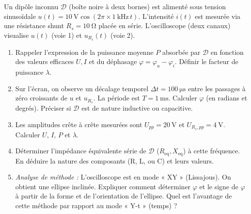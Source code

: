 \documentclass[11pt]{article}
\begin{document}
\begin{exercice}
Un dipôle inconnu $\mathcal{D}$ (boîte noire à deux bornes) est alimenté sous tension sinusoïdale $u(t) = \SI{10}{\volt}\cos(2\pi \times \SI{1}{\kilo\hertz}\, t)$. L'intensité $i(t)$ est mesurée via une résistance shunt $R_s = \SI{10}{\ohm}$ placée en série. L'oscilloscope (deux canaux) visualise $u(t)$ (voie 1) et $u_{R_s}(t)$ (voie 2).
\begin{enumerate}
    \item Rappeler l'expression de la puissance moyenne $P$ absorbée par $\mathcal{D}$ en fonction des valeurs efficaces $U, I$ et du déphasage $\varphi = \varphi_u - \varphi_i$. Définir le facteur de puissance $\lambda$.
    \item Sur l'écran, on observe un décalage temporel $\Delta t = \SI{100}{\micro\second}$ entre les passages à zéro croissants de $u$ et $u_{R_s}$. La période est $T = \SI{1}{\milli\second}$. Calculer $\varphi$ (en radians et degrés). Préciser si $\mathcal{D}$ est de nature inductive ou capacitive.
    \item Les amplitudes crête à crête mesurées sont $U_{pp} = \SI{20}{\volt}$ et $U_{R_s,pp} = \SI{4}{\volt}$. Calculer $U$, $I$, $P$ et $\lambda$.
    \item Déterminer l'impédance équivalente série de $\mathcal{D}$ ($R_{\text{eq}}, X_{\text{eq}}$) à cette fréquence. En déduire la nature des composants (R, L, ou C) et leurs valeurs.
    \item \textit{Analyse de méthode :} L'oscilloscope est en mode « XY » (Lissajous). On obtient une ellipse inclinée. Expliquer comment déterminer $\varphi$ et le signe de $\varphi$ à partir de la forme et de l'orientation de l'ellipse. Quel est l'avantage de cette méthode par rapport au mode « Y-t » (temps) ?
\end{enumerate}
\end{exercice}
\end{document}
